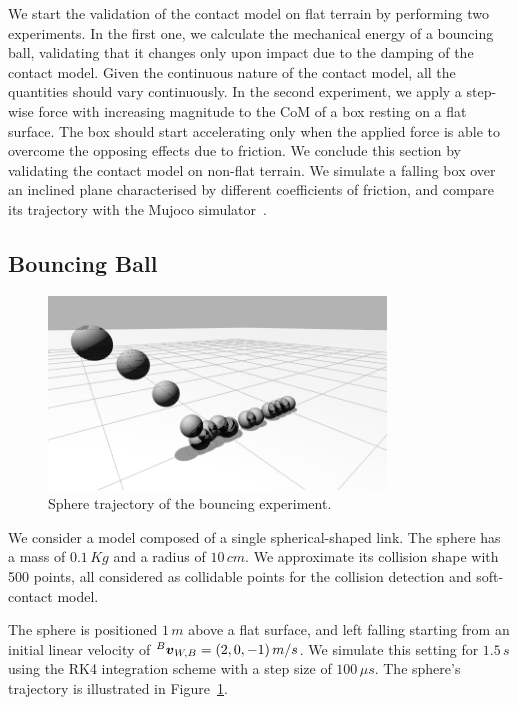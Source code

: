 We start the validation of the contact model on flat terrain by performing two experiments.
In the first one, we calculate the mechanical energy of a bouncing ball, validating that it changes only upon impact due to the damping of the contact model.
Given the continuous nature of the contact model, all the quantities should vary continuously.
In the second experiment, we apply a step-wise force with increasing magnitude to the \ac{CoM} of a box resting on a flat surface.
The box should start accelerating only when the applied force is able to overcome the opposing effects due to friction.
We conclude this section by validating the contact model on non-flat terrain.
We simulate a falling box over an inclined plane characterised by different coefficients of friction, and compare its trajectory with the Mujoco simulator~\parencite{todorov_mujoco_2012}.

\subsection{Bouncing Ball}

\begin{figure}
    \centering
    \includegraphics[width=0.8\textwidth]{images/contributions/chapter_7/bouncing_ball_trajectory.png}
    \caption{Sphere trajectory of the bouncing experiment.}
    \label{fig:bouncing_ball_trajectory}
\end{figure}

We consider a model composed of a single spherical-shaped link.
The sphere has a mass of $0.1 \, Kg$ and a radius of $10 \, cm$.
We approximate its collision shape with 500 points, all considered as collidable points for the collision detection and soft-contact model.

The sphere is positioned $1 \, m$ above a flat surface, and left falling starting from an initial linear velocity of $\vellin[B]_{W,B} = (2, 0, -1) \, m/s$.
We simulate this setting for $1.5 \, s$ using the \ac{RK4} integration scheme with a step size of $100 \, \mu s$.
The sphere's trajectory is illustrated in Figure~\ref{fig:bouncing_ball_trajectory}.


